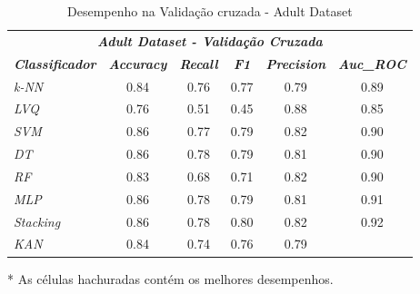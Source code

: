 \documentclass[journal]{IEEEtran}
\begin{document}
\begin{table}[h!]
	\caption{Desempenho na Validação cruzada - Adult Dataset}
	\label{tab:9}
	\begin{threeparttable}
		\begin{tabular}{lccccc}
			\hline
			\multicolumn{6}{c}{\textit{\textbf{Adult Dataset - Validação Cruzada}}}                                                                                                                              \\
			\multicolumn{1}{l|}{\textit{\textbf{Classificador}}} & \textit{\textbf{Accuracy}} & \textit{\textbf{Recall}}  & \textit{\textbf{F1}}      & \textit{\textbf{Precision}} & \textit{\textbf{Auc\_ROC}} \\ \hline
			\multicolumn{1}{l|}{\textit{k-NN}}                   & 0.84                       & 0.76                      & 0.77                      & 0.79                        & 0.89                       \\
			\multicolumn{1}{l|}{\textit{LVQ}}                    & 0.76                       & 0.51                      & 0.45                      & \cellcolor{lightgray}0.88   & 0.85                       \\
			\multicolumn{1}{l|}{\textit{SVM}}                    & \cellcolor{lightgray}0.86  & 0.77                      & 0.79                      & 0.82                        & 0.90                       \\
			\multicolumn{1}{l|}{\textit{DT}}                     & \cellcolor{lightgray}0.86  & \cellcolor{lightgray}0.78 & 0.79                      & 0.81                        & 0.90                       \\
			\multicolumn{1}{l|}{\textit{RF}}                     & 0.83                       & 0.68                      & 0.71                      & 0.82                        & 0.90                       \\
			\multicolumn{1}{l|}{\textit{MLP}}                    & \cellcolor{lightgray}0.86  & \cellcolor{lightgray}0.78 & 0.79                      & 0.81                        & 0.91                       \\
			\multicolumn{1}{l|}{\textit{Stacking}}               & \cellcolor{lightgray}0.86  & \cellcolor{lightgray}0.78 & \cellcolor{lightgray}0.80 & 0.82                        & \cellcolor{lightgray}0.92  \\
			\multicolumn{1}{l|}{\textit{KAN}}                    & 0.84                       & 0.74                      & 0.76                      & 0.79                        &                            \\
			\hline
		\end{tabular}
		\begin{tablenotes}\footnotesize
			\item[*] As células hachuradas contém os melhores desempenhos.
		\end{tablenotes}
	\end{threeparttable}
\end{table}
\end{document}
